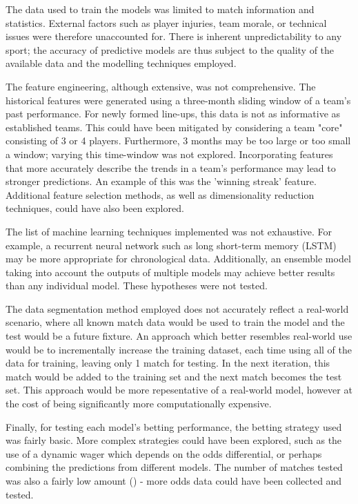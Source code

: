 The data used to train the models was limited to match information and statistics. External factors such as player injuries, team morale, or technical issues were therefore unaccounted for. There is inherent unpredictability to any sport; the accuracy of predictive models are thus subject to the quality of the available data and the modelling techniques employed.

The feature engineering, although extensive, was not comprehensive. The historical features were generated using a three-month sliding window of a team's past performance. For newly formed line-ups, this data is not as informative as established teams. This could have been mitigated by considering a team "core" consisting of 3 or 4 players. Furthermore, 3 months may be too large or too small a window; varying this time-window was not explored. Incorporating features that more accurately describe the trends in a team's performance may lead to stronger predictions. An example of this was the 'winning streak' feature. Additional feature selection methods, as well as dimensionality reduction techniques, could have also been explored.

The list of machine learning techniques implemented was not exhaustive. For example, a recurrent neural network such as long short-term memory (LSTM) may be more appropriate for chronological data. Additionally, an ensemble model taking into account the outputs of multiple models may achieve better results than any individual model. These hypotheses were not tested.

The data segmentation method employed does not accurately reflect a real-world scenario, where all known match data would be used to train the model and the test would be a future fixture. An approach which better resembles real-world use would be to incrementally increase the training dataset, each time using all of the data for training, leaving only 1 match for testing. In the next iteration, this match would be added to the training set and the next match becomes the test set. This approach would be more repesentative of a real-world model, however at the cost of being significantly more computationally expensive.

Finally, for testing each model's betting performance, the betting strategy used was fairly basic. More complex strategies could have been explored, such as the use of a dynamic wager which depends on the odds differential, or perhaps combining the predictions from different models. The number of matches tested was also a fairly low amount (\matchesBet{}) - more odds data could have been collected and tested.

